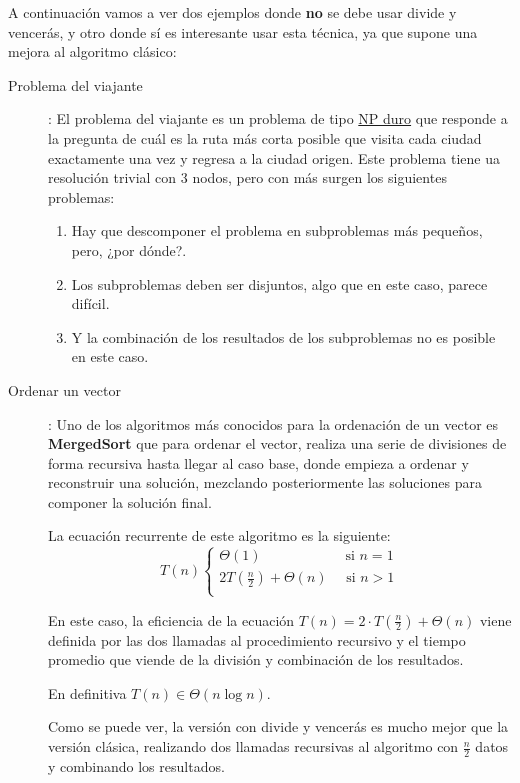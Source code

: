 \documentclass[10pt,a4paper,spanish]{report}
\theoremstyle{definition}
\theoremstyle{remark}
\begin{document}
A continuación vamos a ver dos ejemplos donde \textbf{no} se debe usar divide y vencerás, y otro donde sí es interesante usar esta técnica, ya que supone una mejora al algoritmo clásico:

\begin{description}
    \item [Problema del viajante]: El problema del viajante es un problema de tipo \hyperref[np_prob_def]{NP duro} que responde a la pregunta de cuál es la ruta más corta posible que visita cada ciudad exactamente una vez y regresa a la ciudad origen. Este problema tiene ua resolución trivial con 3 nodos, pero con más surgen los siguientes problemas:
    \begin{enumerate}[$\star$]
        \item Hay que descomponer el problema en subproblemas más pequeños, pero, ¿por dónde?.
        \item Los subproblemas deben ser disjuntos, algo que en este caso, parece difícil.
        \item Y la combinación de los resultados de los subproblemas no es posible en este caso.
    \end{enumerate}
    \item [Ordenar un vector]: Uno de los algoritmos más conocidos para la ordenación de un vector es \textbf{\textcolor[rgb]{0.2,0.5,0.5}{MergedSort}} que para ordenar el vector, realiza una serie de divisiones de forma recursiva hasta llegar al caso base, donde empieza a ordenar y reconstruir una solución, mezclando posteriormente las soluciones para componer la solución final.

    La ecuación recurrente de este algoritmo es la siguiente:
    \label{ef_merge}
    \begin{displaymath}
        T(n) \left\{ \begin{array}{ll}
        \Theta(1)\qquad \qquad \qquad \text{si } n = 1 \\
        2T\left(\frac{n}{2}\right) + \Theta(n) \quad \text{  si } n > 1\\
        \end{array} \right.
    \end{displaymath}
    \begin{center}
        En este caso, la eficiencia de la ecuación $T(n) = 2\cdot T(\frac{n}{2}) + \Theta(n)$ viene definida por las dos llamadas al procedimiento recursivo y el tiempo promedio que viende de la división y combinación de los resultados.

        En definitiva $T(n) \in \Theta(n\log n)$.
    \end{center}

    Como se puede ver, la versión con divide y vencerás es mucho mejor que la versión clásica, realizando dos llamadas recursivas al algoritmo con $\frac{n}{2}$ datos y combinando los resultados.
\end{description}
\end{document}
